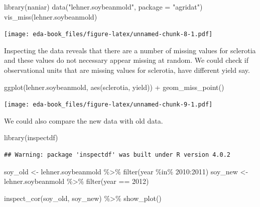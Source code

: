 \documentclass[
]{book}
\newenvironment{Shaded}{\begin{snugshade}}{\end{snugshade}}
\newcommand{\AttributeTok}[1]{\textcolor[rgb]{0.77,0.63,0.00}{#1}}
\newcommand{\DecValTok}[1]{\textcolor[rgb]{0.00,0.00,0.81}{#1}}
\newcommand{\FunctionTok}[1]{\textcolor[rgb]{0.00,0.00,0.00}{#1}}
\newcommand{\NormalTok}[1]{#1}
\newcommand{\OtherTok}[1]{\textcolor[rgb]{0.56,0.35,0.01}{#1}}
\newcommand{\SpecialCharTok}[1]{\textcolor[rgb]{0.00,0.00,0.00}{#1}}
\newcommand{\StringTok}[1]{\textcolor[rgb]{0.31,0.60,0.02}{#1}}
\begin{document}
\begin{Shaded}
\begin{Highlighting}[]
\FunctionTok{library}\NormalTok{(naniar)}
\FunctionTok{data}\NormalTok{(}\StringTok{"lehner.soybeanmold"}\NormalTok{, }\AttributeTok{package =} \StringTok{"agridat"}\NormalTok{)}
\FunctionTok{vis\_miss}\NormalTok{(lehner.soybeanmold)}
\end{Highlighting}
\end{Shaded}

\texttt{[image: eda-book\_files/figure-latex/unnamed-chunk-8-1.pdf]}

Inspecting the data reveals that there are a number of missing values for sclerotia and these values do not necessary appear missing at random. We could check if observational units that are missing values for sclerotia, have different yield say.

\begin{Shaded}
\begin{Highlighting}[]
\FunctionTok{ggplot}\NormalTok{(lehner.soybeanmold, }\FunctionTok{aes}\NormalTok{(sclerotia, yield)) }\SpecialCharTok{+}
  \FunctionTok{geom\_miss\_point}\NormalTok{()}
\end{Highlighting}
\end{Shaded}

\texttt{[image: eda-book\_files/figure-latex/unnamed-chunk-9-1.pdf]}

We could also compare the new data with old data.

\begin{Shaded}
\begin{Highlighting}[]
\FunctionTok{library}\NormalTok{(inspectdf)}
\end{Highlighting}
\end{Shaded}

\begin{verbatim}
## Warning: package 'inspectdf' was built under R version 4.0.2
\end{verbatim}

\begin{Shaded}
\begin{Highlighting}[]
\NormalTok{soy\_old }\OtherTok{\textless{}{-}}\NormalTok{ lehner.soybeanmold }\SpecialCharTok{\%\textgreater{}\%}
  \FunctionTok{filter}\NormalTok{(year }\SpecialCharTok{\%in\%} \DecValTok{2010}\SpecialCharTok{:}\DecValTok{2011}\NormalTok{)}
\NormalTok{soy\_new }\OtherTok{\textless{}{-}}\NormalTok{ lehner.soybeanmold }\SpecialCharTok{\%\textgreater{}\%}
  \FunctionTok{filter}\NormalTok{(year }\SpecialCharTok{==} \DecValTok{2012}\NormalTok{)}

\FunctionTok{inspect\_cor}\NormalTok{(soy\_old, soy\_new) }\SpecialCharTok{\%\textgreater{}\%}
  \FunctionTok{show\_plot}\NormalTok{()}
\end{Highlighting}
\end{Shaded}
\end{document}
